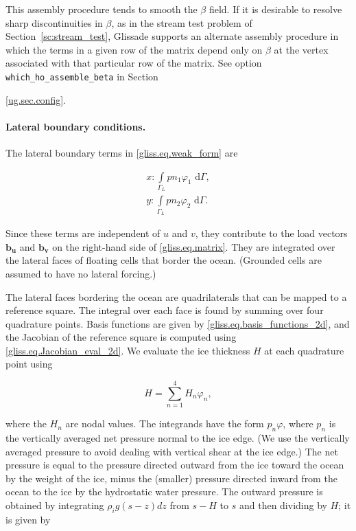 This assembly procedure tends to smooth the $\beta$ field.  If it is desirable to resolve
sharp discontinuities in $\beta$, as in the stream test problem of Section~\ref{sc:stream_test},
Glissade supports an alternate assembly procedure in which the terms in a given row of the matrix
depend only on $\beta$ at the vertex associated with that particular row of the matrix.
See option \texttt{which\_ho\_assemble\_beta} in Section~{\ref{ug.sec.config}.

\paragraph{Lateral boundary conditions.}

The lateral boundary terms in \eqref{gliss.eq.weak_form} are

\begin{equation}
  \label{gliss.eq.lateral_bc}
  \begin{split}
    x: \int\limits_{{\Gamma }_{L}} {p n_1 {{\varphi }_{1}} \text{ d}\Gamma}, \\
    y: \int\limits_{{\Gamma }_{L}} {p n_2 {{\varphi }_{2}} \text{ d}\Gamma}.
  \end{split}
\end{equation}

\noindent
Since these terms are independent of $u$ and $v$, they contribute to the load vectors
$\mathbf{b_u}$ and $\mathbf{b_v}$ on the right-hand side of \eqref{gliss.eq.matrix}.
They are integrated over the lateral faces of floating cells that border the ocean.
(Grounded cells are assumed to have no lateral forcing.)

The lateral faces bordering the ocean are quadrilaterals that can be mapped to a reference square.
The integral over each face is found by summing over four quadrature points.
Basis functions are given by \eqref{gliss.eq.basis_functions_2d}, and
the Jacobian of the reference square is computed using \eqref{gliss.eq.Jacobian_eval_2d}.
We evaluate the ice thickness $H$ at each quadrature point using

\begin{equation}
  \label{gliss.eq.thickness_qp}
  H = \sum\limits_{n=1}^{4} {H_n \varphi_n},
\end{equation}

\noindent
where the $H_n$ are nodal values.
The integrands have the form $p_n \varphi$, where $p_n$ is the vertically averaged
net pressure normal to the ice edge.  
(We use the vertically averaged pressure to avoid dealing with vertical shear at the ice edge.)
The net pressure is equal to the pressure
directed outward from the ice toward the ocean by the weight of the ice, minus the (smaller)
pressure directed inward from the ocean to the ice by the hydrostatic water pressure.
The outward pressure is obtained by integrating $\rho_i g (s-z) dz$ from $s-H$ to $s$
and then dividing by $H$; it is given by 

}
